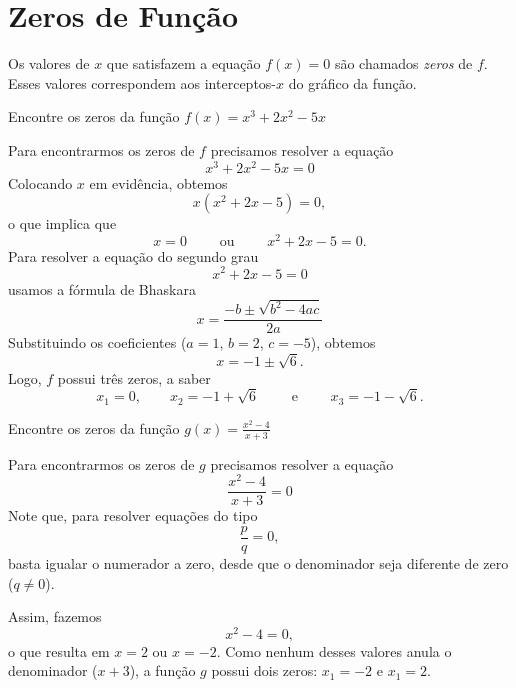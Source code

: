 \section{Zeros de Função}

Os valores de $x$ que satisfazem a equação $f(x)=0$ são chamados
\emph{zeros}
de $f$. Esses valores correspondem aos interceptos-$x$ do gráfico da função.


\begin{example}
  Encontre os zeros da função \(f(x) = x^3+2x^2-5x\)

  \solution
  Para encontrarmos os zeros de $f$ precisamos resolver a equação
  \[
    x^3 + 2x^2 - 5x = 0
  \]
  Colocando $x$ em evidência, obtemos
  \[
    x( x^2 + 2x - 5 ) = 0,
  \]
  o que implica que
  \[
    x = 0
    \qquad\text{ ou }\qquad
    x^2 + 2x - 5 = 0.
  \]
  Para resolver a equação do segundo grau
  \[
    x^2 + 2x- 5 = 0
  \]
  usamos a fórmula de Bhaskara
  \[
    x = \frac{-b \pm \sqrt{b^2 - 4ac}}{2a}
  \]
  Substituindo os coeficientes ($a=1$, $b=2$, $c=-5$),
  obtemos
  \[
    x =-1 \pm \sqrt{6}.
  \]
  Logo, $f$ possui três zeros, a saber
  \[
    x_1 = 0,             \qquad
    x_2 =-1+\sqrt{6}     \qquad
    \text{ e }           \qquad
    x_3 =-1-\sqrt{6}.
  \]
\end{example}

\begin{example}
  Encontre os zeros da função \(g(x) = \frac{x^2-4}{x+3}\)

  \solution
  Para encontrarmos os zeros de $g$ precisamos resolver a equação
  \[
    \frac{x^2-4}{x+3} = 0
  \]
  Note que, para resolver equações do tipo
  \[
    \frac{p}{q}=0,
  \]
  basta igualar o numerador a zero, desde que o denominador seja
  diferente de zero ($q \neq 0$).

  Assim, fazemos
  \[
    x^2 - 4 = 0,
  \]
  o que resulta em $x=2$ ou $x=-2$.
  Como nenhum desses valores anula o denominador ($x+3$),
  a função $g$ possui dois zeros: $x_1=-2$ e $x_1=2$.
\end{example}


